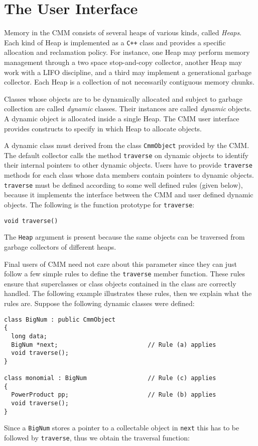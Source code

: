 \section{The User Interface}

Memory in the CMM consists of several heaps of various kinds, called {\em
  Heaps}.  Each kind of Heap is implemented as a {\tt C++} class and provides
a specific allocation and reclamation policy.  For instance, one Heap may
perform memory management through a two space stop-and-copy collector, another
Heap may work with a LIFO discipline, and a third may implement a generational
garbage collector.  Each Heap is a collection of not necessarily contiguous
memory chunks.

Classes whose objects are to be dynamically allocated and subject to garbage
collection are called {\em dynamic\/} classes.  Their instances are called {\em
dynamic\/} objects.  A dynamic object is allocated inside a single Heap.
The CMM user interface provides constructs to specify in which Heap to
allocate objects.


A dynamic class must derived from the class {\tt CmmObject} provided by the
CMM.  The default collector calls the method {\tt traverse} on dynamic objects
to identify their internal pointers to other dynamic objects.  Users have to
provide {\tt traverse} methods for each class whose data members contain
pointers to dynamic objects.  {\tt traverse} must be defined according to some
well defined rules (given below), because it implements the interface between
the CMM and user defined dynamic objects.  The following is the function
prototype for {\tt traverse}:

\begin{verbatim}
void traverse()
\end{verbatim}
The {\tt Heap} argument is present because the same objects can be traversed
from garbage collectors of different heaps.

Final users of CMM need not care about this parameter since they can just
follow a few simple rules to define the {\tt traverse} member function.  These
rules ensure that superclasses or class objects contained in the class are
correctly handled.  The following example illustrates these rules, then we
explain what the rules are.  Suppose the following dynamic classes were
defined:
\begin{verbatim}
class BigNum : public CmmObject
{
  long data;
  BigNum *next;                         // Rule (a) applies
  void traverse();
}

class monomial : BigNum                 // Rule (c) applies
{
  PowerProduct pp;                      // Rule (b) applies
  void traverse();
}
\end{verbatim}
Since a {\tt BigNum} stores a pointer to a collectable object in {\tt next}
this has to be followed by {\tt traverse}, thus we obtain the traversal
function:

